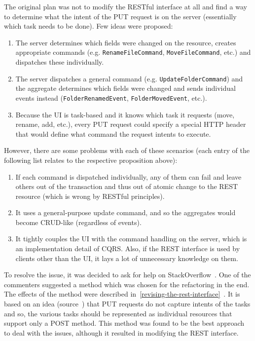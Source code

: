 \documentclass{book}
\begin{document}
The original plan was not to modify the RESTful interface at all and
find a way to determine what the intent of the PUT request is on the
server (essentially which task needs to be done). Few ideas were
proposed:

\begin{enumerate}
\def\labelenumi{\arabic{enumi}.}
\tightlist
\item
  The server determines which fields were changed on the resource,
  creates appropriate commands (e.g. \texttt{RenameFileCommand},
  \texttt{MoveFileCommand}, etc.) and dispatches these individually.
\item
  The server dispatches a general command (e.g.
  \texttt{UpdateFolderCommand}) and the aggregate determines which
  fields were changed and sends individual events instead
  (\texttt{FolderRenamedEvent}, \texttt{FolderMovedEvent}, etc.).
\item
  Because the UI is task-based and it knows which task it requests
  (move, rename, add, etc.), every PUT request could specify a special
  HTTP header that would define what command the request intents to execute.
\end{enumerate}

However, there are some problems with each of these scenarios (each
entry of the following list relates to the respective proposition
above):

\begin{enumerate}
\def\labelenumi{\arabic{enumi}.}
\tightlist
\item
  If each command is dispatched individually, any of them can fail
  and leave others out of the transaction and thus out of atomic change to the
  REST resource (which is wrong by RESTful principles).
\item
  It uses a general-purpose update command, and so the aggregates would
  become CRUD-like (regardless of events).
\item
  It tightly couples the UI with the command handling on the server,
  which is an implementation detail of CQRS. Also, if the REST interface
  is used by clients other than the UI, it lays a lot of unnecessary
  knowledge on them.
\end{enumerate}

To resolve the issue, it was decided to ask for help on StackOverflow~\cite{stackexchange}. One of the commenters suggested a method which was
chosen for the refactoring in the end. The effects of the method were
described
in~\ref{revising-the-rest-interface}~.
It is based on an idea (source~\cite{putless-rest}) that PUT requests do
not capture intents of the tasks and so, the various tasks should be
represented as individual resources that support only a POST method.
This method was found to be the best approach to deal with the issues, although
it resulted in modifying the REST interface.
\end{document}
